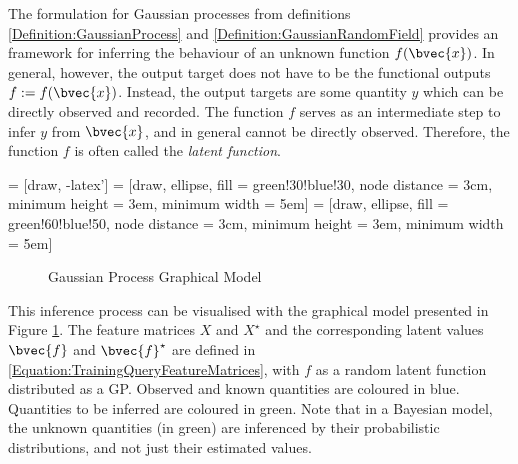 				The formulation for Gaussian processes from definitions \ref{Definition:GaussianProcess} and \ref{Definition:GaussianRandomField} provides an framework for inferring the behaviour of an unknown function $f(\bvec{x})$. In general, however, the output target does not have to be the functional outputs $f := f(\bvec{x})$. Instead, the output targets are some quantity $y$ which can be directly observed and recorded. The function $f$ serves as an intermediate step to infer $y$ from $\bvec{x}$, and in general cannot be directly observed. Therefore, the function $f$ is often called the \textit{latent function}.
				
				 = [draw, -latex']
				 = [draw, ellipse, fill = green!30!blue!30, node distance = 3cm, minimum height = 3em,  minimum width = 5em]
				 = [draw, ellipse, fill = green!60!blue!50, node distance = 3cm, minimum height = 3em,  minimum width = 5em]
				
				\begin{figure}[!ht]
				\centering{}		
				\caption{Gaussian Process Graphical Model}
				\label{Figure:GaussianProcessGraphicalModel}
				\end{figure}
				
				This inference process can be visualised with the graphical model presented in Figure \ref{Figure:GaussianProcessGraphicalModel}. The feature matrices $X$ and $X^{\star}$ and the corresponding latent values $\bvec{f}$ and $\bvec{f}^{\star}$ are defined in \eqref{Equation:TrainingQueryFeatureMatrices}, with $f$ as a random latent function distributed as a GP. Observed and known quantities are coloured in blue. Quantities to be inferred are coloured in green. Note that in a Bayesian model, the unknown quantities (in green) are inferenced by their probabilistic distributions, and not just their estimated values. 
				
